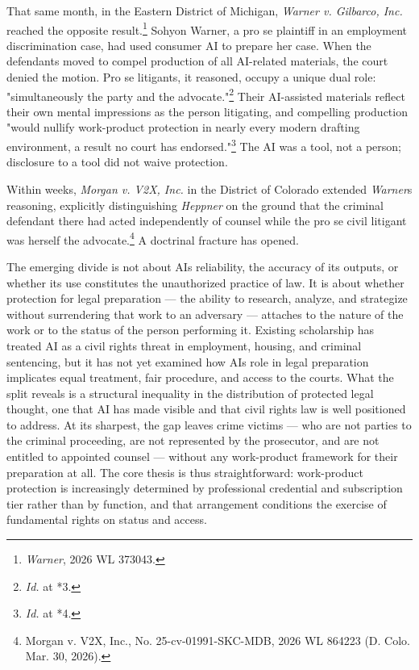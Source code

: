 \documentclass[
  12pt,
]{article}
\begin{document}
That same month, in the Eastern District of Michigan, \emph{Warner v.
Gilbarco, Inc.} reached the opposite result.\footnote{\emph{Warner},
  2026 WL 373043.} Sohyon Warner, a pro se plaintiff in an employment
discrimination case, had used consumer AI to prepare her case. When the
defendants moved to compel production of all AI-related materials, the
court denied the motion. Pro se litigants, it reasoned, occupy a unique
dual role: "simultaneously the party and the advocate."\footnote{\emph{Id.}
  at *3.} Their AI-assisted materials reflect their own mental
impressions as the person litigating, and compelling production "would
nullify work-product protection in nearly every modern drafting
environment, a result no court has endorsed."\footnote{\emph{Id.} at *4.}
The AI was a tool, not a person; disclosure to a tool did not waive
protection.

Within weeks, \emph{Morgan v. V2X, Inc.} in the District of Colorado
extended \emph{Warner}\textquotesingle s reasoning, explicitly
distinguishing \emph{Heppner} on the ground that the criminal defendant
there had acted independently of counsel while the pro se civil litigant
was herself the advocate.\footnote{Morgan v. V2X, Inc., No.
  25-cv-01991-SKC-MDB, 2026 WL 864223 (D. Colo. Mar. 30, 2026).} A
doctrinal fracture has opened.

The emerging divide is not about AI\textquotesingle s reliability, the
accuracy of its outputs, or whether its use constitutes the
unauthorized practice of law. It is about whether protection for legal
preparation --- the ability to research, analyze, and strategize without
surrendering that work to an adversary --- attaches to the nature of the
work or to the status of the person performing it. Existing scholarship
has treated AI as a civil rights threat in employment, housing, and
criminal sentencing, but it has not yet examined how AI\textquotesingle s
role in legal preparation implicates equal treatment, fair procedure,
and access to the courts. What the split reveals is a structural
inequality in the distribution of protected legal thought, one that AI
has made visible and that civil rights law is well positioned to
address. At its sharpest, the gap leaves crime victims --- who are not
parties to the criminal proceeding, are not represented by the
prosecutor, and are not entitled to appointed counsel --- without any
work-product framework for their preparation at all. The core thesis is
thus straightforward: work-product protection is increasingly determined
by professional credential and subscription tier rather than by
function, and that arrangement conditions the exercise of fundamental
rights on status and access.
\end{document}
